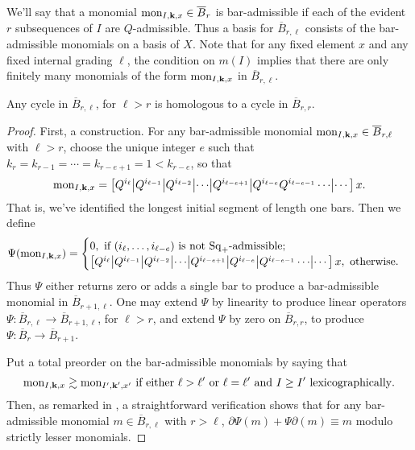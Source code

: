 \documentclass[10pt]{article}
\renewcommand{\Q}{Q}
\newcommand{\SqShift}{\Sq_{+}}
\newcommand{\Sq}{\mathrm{Sq}}
\newcommand{\minDim}{m}
\newcommand{\BarMonomial}[3]{\textup{mon}_{#1,#2,#3}}
\begin{document}
\begin{KoszulComplexes2plus}
\begin{prop}
\end{prop}
\noindent We'll say that a monomial $\BarMonomial{I}{\textbf{k}}{x}\in\overline{B}_r$ is bar-admissible if each of the evident $r$ subsequences of $I$ are $\Q$-admissible. Thus a basis for $\overline{B}_{r,\ell}$ consists of the bar-admissible monomials on a basis of $X$. Note that for any fixed element $x$ and any fixed internal grading $\ell$, the condition on $\minDim(I)$ implies that there are only finitely many monomials of the form $\BarMonomial{I}{\textbf{k}}{x}$ in $\overline{B}_{r,\ell}$.
\begin{prop}
Any cycle in $\overline{B}_{r,\ell}$, for $\ell>r$ is homologous to a cycle in $\overline{B}_{r,r}$.
\end{prop}
\begin{proof}
First, a construction. For any bar-admissible monomial $\BarMonomial{I}{\textbf{k}}{x}\in\overline{B}_{r,\ell}$ with $\ell>r$, choose the unique integer $e$ such that $k_r=k_{r-1}=\cdots =k_{r-e+1}=1<k_{r-e}$, so that
\[\BarMonomial{I}{\textbf{k}}{x}=\left[\Q^{i_\ell}\middle|\Q^{i_{\ell-1}} \middle|\Q^{i_{\ell-2}}\middle|\cdots \middle|\Q^{i_{\ell-e+1}}\middle|\Q^{i_{\ell-e}}\Q^{i_{\ell-e-1}}\cdots \middle|\cdots \right]x.\]
That is, we've identified the longest initial segment of length one bars. Then we define
\[\Psi(\BarMonomial{I}{\textbf{k}}{x})=\begin{cases}
0,\textup{ if }(i_{\ell},\ldots,i_{\ell-e})\textup{ is not $\SqShift$-admissible};\\
\left[\Q^{i_\ell}\middle|\Q^{i_{\ell-1}} \middle|\Q^{i_{\ell-2}}\middle|\cdots \middle|\Q^{i_{\ell-e+1}}\middle|\Q^{i_{\ell-e}}\middle|\Q^{i_{\ell-e-1}}\cdots \middle|\cdots \right]x,\textup{ otherwise}.
\end{cases}
\]
Thus $\Psi$ either returns zero or adds a single bar to produce a bar-admissible monomial in $\overline{B}_{r+1,\ell}$. One may extend $\Psi$ by linearity to produce linear operators $\Psi:\overline{B}_{r,\ell}\to\overline{B}_{r+1,\ell}$, for $\ell>r$, and extend $\Psi$ by zero on $\overline{B}_{r,r}$, to produce $\Psi:\overline{B}_{r}\to\overline{B}_{r+1}$.


Put a total preorder on the bar-admissible monomials by saying that
\[\BarMonomial{I}{\textbf{k}}{x}\gtrsim \BarMonomial{I'}{\textbf{k}'}{x'}\textup{ if either } \ell>\ell'\textup{ or }\ell=\ell'\textup{ and }I\geq I'\textup{ lexicographically}.\]
Then, as remarked in \cite[proof of thm 5.3]{PriddyKoszul.pdf}, a straightforward verification shows that for any bar-admissible monomial $m\in\overline{B}_{r,\ell}$ with $r>\ell$, $\partial\Psi(m)+\Psi\partial(m)\equiv m$ modulo strictly lesser monomials.


\end{proof}
\end{KoszulComplexes2plus}
\end{document}
